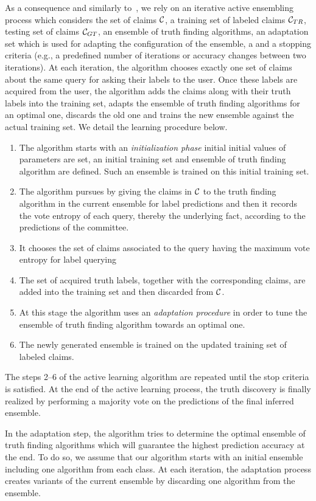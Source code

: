 As a consequence and similarly to~\cite{Lu15}, we rely on an iterative active ensembling process which considers the set of claims $\mathcal{C}{}$, 
a training set of labeled claims $\mathcal{C}_{TR}$, testing set of claims $\mathcal{C}_{GT}$, an ensemble of truth finding algorithms, an adaptation
set which is used for adapting the configuration of the ensemble, a  and a stopping criteria (e.g., a predefined number of iterations or accuracy changes
between two iterations). At each iteration, the algorithm chooses exactly one set of claims about the same query for asking their labels to the user. Once
these labels are acquired from the user, the algorithm  adds the claims along with their truth labels into the training set, adapts the ensemble of truth 
finding algorithms for an optimal one, discards the old one and trains the new ensemble against the actual training set. We detail the learning procedure below.

\begin{enumerate}
\item The algorithm starts with an \emph{initialization phase} initial initial values of parameters are set, an initial training set and ensemble of truth finding
algorithm are defined. Such an ensemble is trained on this initial training set.
 \item The algorithm pursues by giving the claims in $\mathcal{C}{}$ to the truth finding algorithm in the current ensemble for label predictions and then 
 it records the vote entropy of each query, thereby the underlying fact, according to the predictions of the committee.
 \item It chooses the set of claims associated to the query having the maximum vote entropy for label querying
 \item The set of acquired truth labels, together with the corresponding claims, are added into the training set and then discarded from $\mathcal{C}{}$.
 \item At this stage the algorithm uses an \emph{adaptation procedure} in order to tune the ensemble of truth finding algorithm towards an optimal one.
 \item The newly generated ensemble is trained on the updated training set of labeled claims.
\end{enumerate}

The steps 2--6 of the active learning algorithm are repeated until the stop criteria is satisfied. 
At the end of the active learning process, the truth discovery is finally realized by performing 
a majority vote on the predictions of the final inferred ensemble. 

In the adaptation step, the algorithm tries to determine the optimal ensemble of 
truth finding algorithms which will guarantee the highest prediction accuracy  at the end. To do
so, we assume that our algorithm starts with an initial ensemble including one algorithm from each class.
At each iteration, the adaptation process creates variants of the current ensemble by discarding one algorithm
from the ensemble. 
